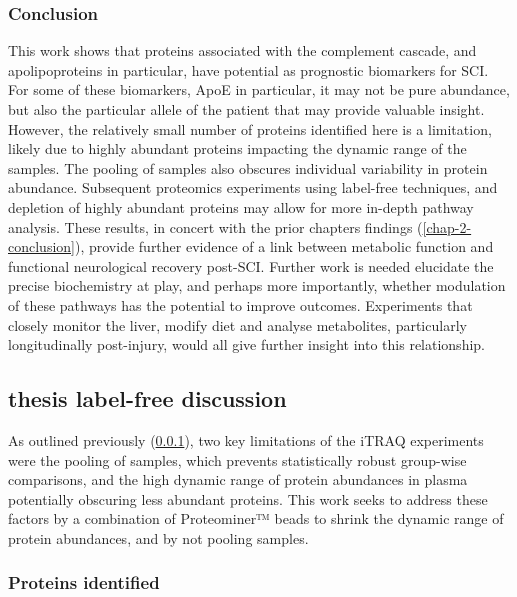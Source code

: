 \documentclass[9pt,lineno]{elife}
\begin{document}
\hypertarget{chap-3-conc}{%
\subsubsection{Conclusion}\label{chap-3-conc}}

This work shows that proteins associated with the complement cascade, and apolipoproteins in particular, have potential as prognostic biomarkers for SCI.
For some of these biomarkers, ApoE in particular, it may not be pure abundance, but also the particular allele of the patient that may provide valuable insight.
However, the relatively small number of proteins identified here is a limitation, likely due to highly abundant proteins impacting the dynamic range of the samples.
The pooling of samples also obscures individual variability in protein abundance.
Subsequent proteomics experiments using label-free techniques, and depletion of highly abundant proteins may allow for more in-depth pathway analysis.
These results, in concert with the prior chapters findings (\ref{chap-2-conclusion}), provide further evidence of a link between metabolic function and functional neurological recovery post-SCI.
Further work is needed elucidate the precise biochemistry at play, and perhaps more importantly, whether modulation of these pathways has the potential to improve outcomes.
Experiments that closely monitor the liver, modify diet and analyse metabolites, particularly longitudinally post-injury, would all give further insight into this relationship.

\hypertarget{thesis-label-free-discussion}{%
\subsection{thesis label-free discussion}\label{thesis-label-free-discussion}}

As outlined previously (\ref{chap-3-conc}), two key limitations of the iTRAQ experiments were the pooling of samples, which prevents statistically robust group-wise comparisons, and the high dynamic range of protein abundances in plasma potentially obscuring less abundant proteins.
This work seeks to address these factors by a combination of Proteominer™ beads to shrink the dynamic range of protein abundances, and by not pooling samples.

\hypertarget{proteins-identified-1}{%
\subsubsection{Proteins identified}\label{proteins-identified-1}}
\end{document}
